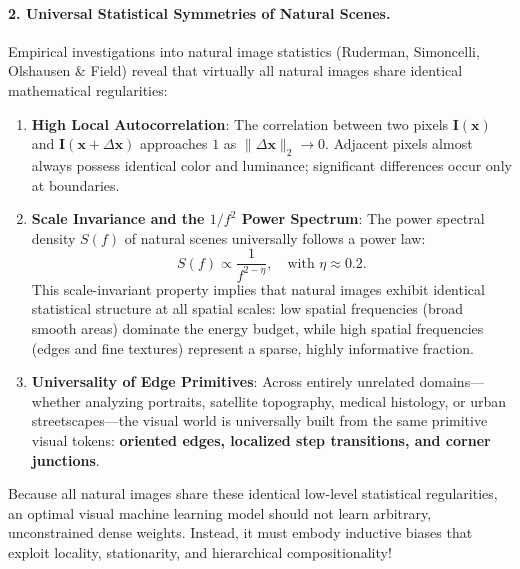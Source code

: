 \paragraph{2. Universal Statistical Symmetries of Natural Scenes.}
Empirical investigations into natural image statistics (Ruderman, Simoncelli, Olshausen \& Field) reveal that virtually all natural images share identical mathematical regularities:
\begin{enumerate}
  \item \textbf{High Local Autocorrelation}: The correlation between two pixels $\mathbf{I}(\mathbf{x})$ and $\mathbf{I}(\mathbf{x} + \Delta \mathbf{x})$ approaches $1$ as $\|\Delta \mathbf{x}\|_2 \to 0$. Adjacent pixels almost always possess identical color and luminance; significant differences occur only at boundaries.
  \item \textbf{Scale Invariance and the $1/f^2$ Power Spectrum}: The power spectral density $S(f)$ of natural scenes universally follows a power law:
    \begin{equation}
    S(f) \propto \frac{1}{f^{2 - \eta}}, \quad \text{with } \eta \approx 0.2.
    \label{eq:power_spectrum_law}
    \end{equation}
    This scale-invariant property implies that natural images exhibit identical statistical structure at all spatial scales: low spatial frequencies (broad smooth areas) dominate the energy budget, while high spatial frequencies (edges and fine textures) represent a sparse, highly informative fraction.
  \item \textbf{Universality of Edge Primitives}: Across entirely unrelated domains—whether analyzing portraits, satellite topography, medical histology, or urban streetscapes—the visual world is universally built from the same primitive visual tokens: \textbf{oriented edges, localized step transitions, and corner junctions}.
\end{enumerate}

Because all natural images share these identical low-level statistical regularities, an optimal visual machine learning model should not learn arbitrary, unconstrained dense weights. Instead, it must embody inductive biases that exploit locality, stationarity, and hierarchical compositionality!

